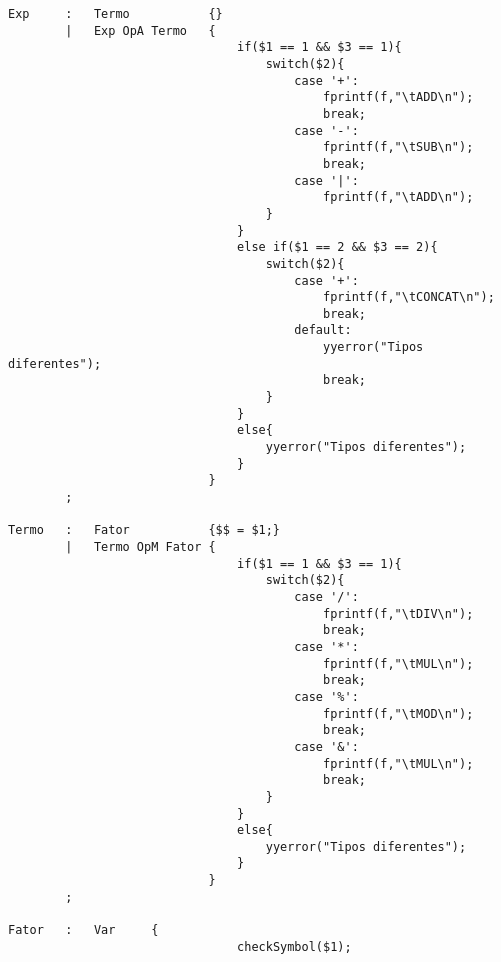 \documentclass{report}
\begin{document}
\begin{verbatim}
Exp     :   Termo           {}
        |   Exp OpA Termo   {
                                if($1 == 1 && $3 == 1){
                                    switch($2){
                                        case '+': 
                                            fprintf(f,"\tADD\n");
                                            break;
                                        case '-': 
                                            fprintf(f,"\tSUB\n");
                                            break;
                                        case '|':
                                            fprintf(f,"\tADD\n");
                                    }
                                }
                                else if($1 == 2 && $3 == 2){
                                    switch($2){
                                        case '+': 
                                            fprintf(f,"\tCONCAT\n");
                                            break;
                                        default:
                                            yyerror("Tipos diferentes");
                                            break;
                                    }
                                }
                                else{
                                    yyerror("Tipos diferentes");
                                }
                            }
        ;

Termo   :   Fator           {$$ = $1;}
        |   Termo OpM Fator {
                                if($1 == 1 && $3 == 1){
                                    switch($2){
                                        case '/': 
                                            fprintf(f,"\tDIV\n");
                                            break;
                                        case '*': 
                                            fprintf(f,"\tMUL\n");
                                            break;
                                        case '%': 
                                            fprintf(f,"\tMOD\n");
                                            break;
                                        case '&':
                                            fprintf(f,"\tMUL\n");
                                            break;
                                    }
                                }
                                else{
                                    yyerror("Tipos diferentes");
                                }
                            }
        ;

Fator   :   Var     {
                                checkSymbol($1);


\end{verbatim}
\end{document}
